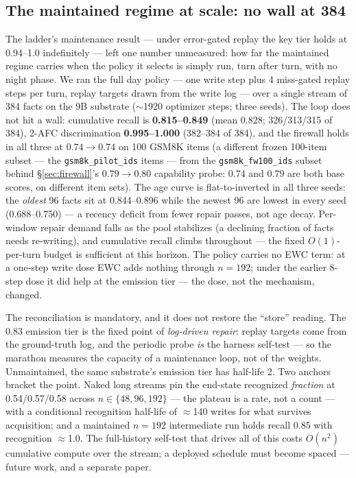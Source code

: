 \documentclass[11pt]{article}
\begin{document}
\subsection{The maintained regime at scale: no wall at 384}\label{sec:marathon}

The ladder's maintenance result --- under error-gated replay the key tier holds at 0.94--1.0
indefinitely --- left one number unmeasured: how far the maintained regime carries when the
policy it selects is simply run, turn after turn, with no night phase. We ran the full day
policy --- one write step plus 4 miss-gated replay steps per turn, replay targets drawn from
the write log --- over a single stream of 384 facts on the 9B substrate ($\sim$1920 optimizer
steps; three seeds). The loop does not hit a wall: cumulative recall is \textbf{0.815--0.849}
(mean 0.828; 326/313/315 of 384), 2-AFC discrimination \textbf{0.995--1.000} (382--384 of 384), and the firewall holds in all three at
$0.74\to0.74$ on 100 GSM8K items (a different frozen 100-item subset --- the
\texttt{gsm8k\_pilot\_ids} items --- from the \texttt{gsm8k\_fw100\_ids} subset behind
\S\ref{sec:firewall}'s $0.79\to0.80$ capability probe: 0.74 and 0.79 are both base scores, on
different item sets). The age curve is flat-to-inverted in all three seeds:
the \emph{oldest} 96 facts sit at 0.844--0.896 while the newest 96 are lowest in every seed
(0.688--0.750) --- a recency deficit from fewer repair passes, not age decay. Per-window repair
demand falls as the pool stabilizes (a declining fraction of facts needs re-writing), and
cumulative recall climbs throughout --- the fixed $O(1)$-per-turn budget is sufficient at this
horizon. The policy carries no
EWC term: at a one-step write dose EWC adds nothing through $n{=}192$; under the earlier
8-step dose it did help at the emission tier --- the dose, not the mechanism, changed.

The reconciliation is mandatory, and it does not restore the ``store'' reading. The 0.83
emission tier is the fixed point of \emph{log-driven repair}: replay targets come
from the ground-truth log, and the periodic probe \emph{is} the harness self-test --- so the
marathon measures the capacity of a maintenance loop, not of the weights. Unmaintained, the
same substrate's emission tier has half-life 2. Two anchors bracket the point. Naked long
streams pin the end-state recognized \emph{fraction} at 0.54/0.57/0.58 across
$n\in\{48,96,192\}$ --- the plateau is a rate, not a count --- with a conditional recognition
half-life of $\approx$140 writes for what survives acquisition; and a maintained $n{=}192$
intermediate run holds recall 0.85 with recognition $\approx$1.0. The full-history self-test
that drives all of this costs $O(n^2)$ cumulative compute over the stream; a deployed schedule
must become spaced --- future work, and a separate paper.
\end{document}
